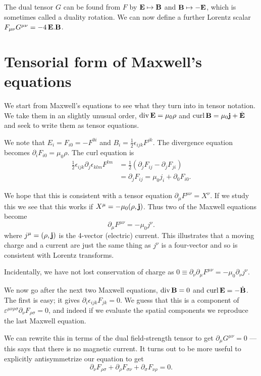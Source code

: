 \documentclass{notes}
\newcommand{\B}{\vect{B}}
\newcommand{\E}{\vect{E}}
\newcommand{\jc}{\vect{j}}
\DeclareMathOperator{\curl}{curl}
\DeclareMathOperator{\dive}{div}
\begin{document}
The dual tensor $G$ can be found from $F$ by $\E \mapsto \B$ and
$\B \mapsto - \E$, which is sometimes called a duality rotation.  We
can now define a further Lorentz scalar $F_{\mu \nu} G^{\mu \nu}
= - 4\, \E . \B$.

\section{Tensorial form of Maxwell's equations}

We start from Maxwell's equations to see what they turn into in tensor
notation.  We take them in an slightly unusual order, $\dive \E =
\mu_0 \rho$ and $\curl \B = \mu_0 \jc + \dot{\E}$ and seek to write them
as tensor equations.

We note that $E_i = F_{i 0} = -F^{0 i}$ and $B_i = \frac{1}{2} \epsilon_{ijk}
F^{jk}$.  The divergence equation becomes $\partial_i F_{i 0} = \mu_0 \rho$.
The curl equation is
\begin{align*}
\frac{1}{2} \epsilon_{i j k} \partial_j \epsilon_{k l m} F^{l m}
& = \frac{1}{2} \left( \partial_j F_{i j} - \partial_j F_{j i} \right)\\
& = \partial_j F_{ij} = \mu_0 j_i + \partial_0 F_{i 0}.
\end{align*}

We hope that this is consistent with a tensor equation
$\partial_\mu F^{\mu \nu} = X^\nu$.  If we study this we see that
this works if $X^\mu= - \mu_0 ( \rho, \jc )$.  Thus two of the Maxwell
equations become
\[
\partial_\mu F^{\mu \nu} = - \mu_0 j^\nu.
\]
where $j^\mu = (\rho,\jc)$ is the 4-vector (electric) current.  This
illustrates that a moving charge and a current are just the same thing as
$j^\nu$ is a four-vector and so is consistent with Lorentz transforms.

Incidentally, we have not lost conservation of charge as
$0 \equiv \partial_\nu \partial_\mu F^{\mu \nu} = - \mu_0 \partial_\nu
j^\nu$.

We now go after the next two Maxwell equations, $\dive \B = 0$
and $\curl \E = - \dot{\B}$.  The first is easy; it gives
$\partial_i \epsilon_{i j k} F_{j k} = 0$.  We guess that this is a
component of $\varepsilon^{\mu \nu \rho \sigma} \partial_\nu
F_{\rho \sigma} = 0$, and indeed if we evaluate the spatial components
we reproduce the last Maxwell equation. 

We can rewrite this in terms of the dual field-strength tensor to get
$\partial_\mu G^{\mu \nu} = 0$ --- this says that there is no magnetic
current.  It turns out to be more useful to explicitly antisymmetrize our
equation to get
\[
\partial_\nu F_{\rho \sigma} + \partial_\rho F_{\sigma\nu}
+ \partial_\sigma F_{\nu \rho} = 0.
\]
\end{document}
